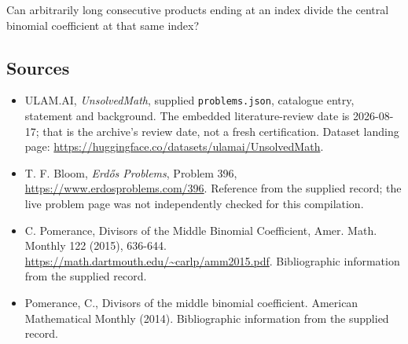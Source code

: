 \documentclass[11pt,a4paper]{article}
\begin{document}
Can arbitrarily long consecutive products ending at an index divide the central binomial coefficient at that same index?

\subsection{Sources}

{\small

\begin{itemize}

\item[\hypertarget{source:statement:1}{S1}] ULAM.AI, \emph{UnsolvedMath}, supplied \texttt{problems.json}, catalogue entry, statement and background. The embedded literature-review date is 2026-08-17; that is the archive’s review date, not a fresh certification. Dataset landing page: \url{https://huggingface.co/datasets/ulamai/UnsolvedMath}.

\item[\hypertarget{source:statement:2}{S2}] T. F. Bloom, \emph{Erdős Problems}, Problem 396, \url{https://www.erdosproblems.com/396}. Reference from the supplied record; the live problem page was not independently checked for this compilation.

\item[\hypertarget{source:statement:3}{S3}] C. Pomerance, Divisors of the Middle Binomial Coefficient, Amer. Math. Monthly 122 (2015), 636-644. \url{https://math.dartmouth.edu/~carlp/amm2015.pdf}. Bibliographic information from the supplied record.

\item[\hypertarget{source:statement:4}{S4}] Pomerance, C., Divisors of the middle binomial coefficient. American Mathematical Monthly (2014). Bibliographic information from the supplied record.

\end{itemize}

}

\label{end:statement}
\end{document}
